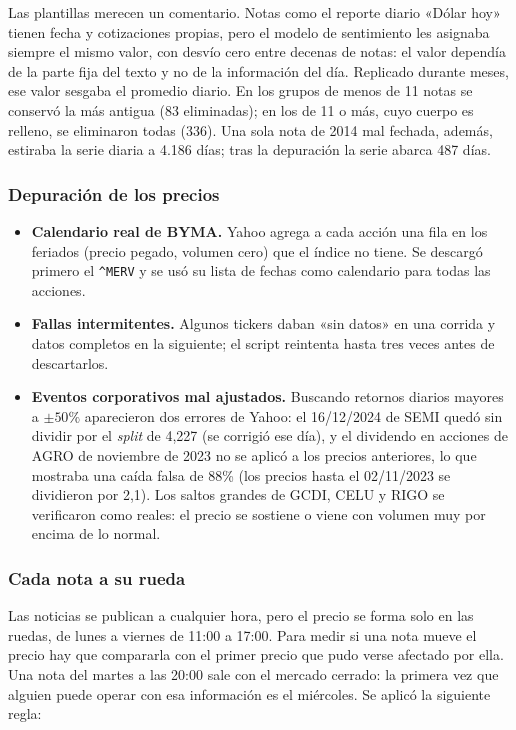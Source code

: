 Las plantillas merecen un comentario. Notas como el reporte diario «Dólar hoy» tienen fecha y
cotizaciones propias, pero el modelo de sentimiento les asignaba siempre el mismo valor, con
desvío cero entre decenas de notas: el valor dependía de la parte fija del texto y no de la
información del día. Replicado durante meses, ese valor sesgaba el promedio diario. En los
grupos de menos de 11 notas se conservó la más antigua (83 eliminadas); en los de 11 o más,
cuyo cuerpo es relleno, se eliminaron todas (336). Una sola nota de 2014 mal fechada, además,
estiraba la serie diaria a 4.186 días; tras la depuración la serie abarca 487 días.

\subsubsection{Depuración de los precios}

\begin{itemize}
  \item \textbf{Calendario real de BYMA.} Yahoo agrega a cada acción una fila en los feriados
        (precio pegado, volumen cero) que el índice no tiene. Se descargó primero el
        \texttt{\^{}MERV} y se usó su lista de fechas como calendario para todas las acciones.
  \item \textbf{Fallas intermitentes.} Algunos tickers daban «sin datos» en una corrida y
        datos completos en la siguiente; el script reintenta hasta tres veces antes de
        descartarlos.
  \item \textbf{Eventos corporativos mal ajustados.} Buscando retornos diarios mayores a
        $\pm50\%$ aparecieron dos errores de Yahoo: el 16/12/2024 de SEMI quedó sin dividir
        por el \textit{split} de 4,227 (se corrigió ese día), y el dividendo en acciones de
        AGRO de noviembre de 2023 no se aplicó a los precios anteriores, lo que mostraba una
        caída falsa de 88\% (los precios hasta el 02/11/2023 se dividieron por 2,1). Los
        saltos grandes de GCDI, CELU y RIGO se verificaron como reales: el precio se sostiene
        o viene con volumen muy por encima de lo normal.
\end{itemize}

\subsubsection{Cada nota a su rueda}
\label{sec:alineacion}

Las noticias se publican a cualquier hora, pero el precio se forma solo en las ruedas, de lunes
a viernes de 11:00 a 17:00. Para medir si una nota mueve el precio hay que compararla con el
primer precio que pudo verse afectado por ella. Una nota del martes a las 20:00 sale con el
mercado cerrado: la primera vez que alguien puede operar con esa información es el miércoles.
Se aplicó la siguiente regla:

